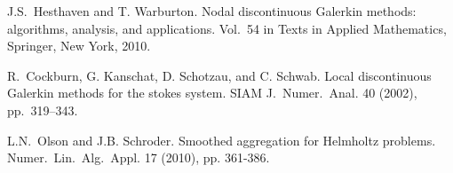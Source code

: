 
\begin{thebibliography}{10}
{\sc J.S.~Hesthaven and T. Warburton}. {Nodal discontinuous Galerkin methods:  algorithms, analysis, and applications}. Vol.~54 in Texts in Applied Mathematics, Springer, New York, 2010.

{\sc R.~Cockburn, G. Kanschat, D. Schotzau, and C. Schwab}. {Local discontinuous Galerkin methods for the stokes system}. SIAM J.~Numer.~Anal. 40 (2002), pp.~319--343.

{\sc L.N.~Olson and J.B. Schroder}. {Smoothed aggregation for Helmholtz problems}. Numer.~Lin.~Alg.~Appl. 
17 (2010), pp. 361-386. 
\end{thebibliography}